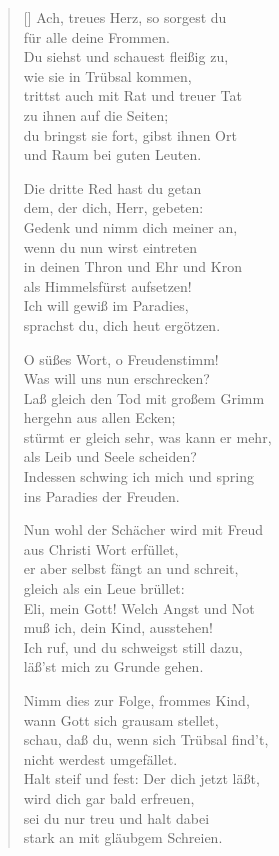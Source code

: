 \begin{multicols}{2}
\begin{verse}[\versewidth]
 Ach, treues Herz, so sorgest du\\
für alle deine Frommen.\\
Du siehst und schauest fleißig zu,\\
wie sie in Trübsal kommen,\\
trittst auch mit Rat und treuer Tat\\
zu ihnen auf die Seiten;\\
du bringst sie fort, gibst ihnen Ort\\
und Raum bei guten Leuten.

 Die dritte Red hast du getan\\
dem, der dich, Herr, gebeten:\\
Gedenk und nimm dich meiner an,\\
wenn du nun wirst eintreten\\
in deinen Thron und Ehr und Kron\\
als Himmelsfürst aufsetzen!\\
Ich will gewiß im Paradies,\\
sprachst du, dich heut ergötzen.

\vfill\null
\columnbreak


 O süßes Wort, o Freudenstimm!\\
Was will uns nun erschrecken?\\
Laß gleich den Tod mit großem Grimm\\
hergehn aus allen Ecken;\\
stürmt er gleich sehr, was kann er mehr,\\
als Leib und Seele scheiden?\\
Indessen schwing ich mich und spring\\
ins Paradies der Freuden.

 Nun wohl der Schächer wird mit Freud\\
aus Christi Wort erfüllet,\\
er aber selbst fängt an und schreit,\\
gleich als ein Leue brüllet:\\
Eli, mein Gott! Welch Angst und Not\\
muß ich, dein Kind, ausstehen!\\
Ich ruf, und du schweigst still dazu,\\
läß'st mich zu Grunde gehen.

 Nimm dies zur Folge, frommes Kind,\\
wann Gott sich grausam stellet,\\
schau, daß du, wenn sich Trübsal find't,\\
nicht werdest umgefället.\\
Halt steif und fest: Der dich jetzt läßt,\\
wird dich gar bald erfreuen,\\
sei du nur treu und halt dabei\\
stark an mit gläubgem Schreien.


\end{verse}
\end{multicols}
